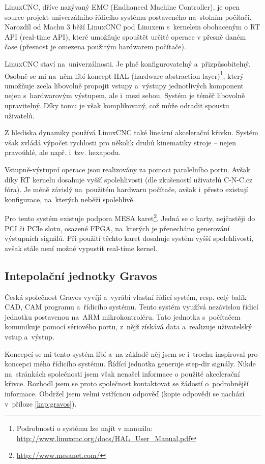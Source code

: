 		LinuxCNC, dříve nazývaný EMC (Endhanced Machine Controller), je open source projekt univerzálního řídicího systému postaveného na~stolním počítači\cite{linuxcnc}. Narozdíl od Machu 3 běží LinuxCNC pod Linuxem s~kernelem obohaceným o RT API (real-time API), které umožňuje spouštět určité operace v přesně daném čase (přesnost je omezena použitým hardwarem počítače).
		
		LinuxCNC staví na~univerzálnosti. Je plně konfigurovatelný a~přizpůsobitelný. Osobně se mi na~něm líbí koncept HAL (hardware abstraction layer)\footnote{Podrobnosti o systému lze najít v manuálu: \url{http://www.linuxcnc.org/docs/HAL\_User\_Manual.pdf}}, který umožňuje zcela libovolně propojit vstupy a~výstupy jednotlivých komponent nejen s~hardwarovým výstupem, ale i~mezi sebou. Systém je téměř libovolně upravitelný. Díky tomu je však komplikovaný, což může odradit spoustu uživatelů. 
		
		Z hlediska dynamiky používá LinuxCNC také lineární akcelerační křivku. Systém však zvládá výpočet rychlosti pro několik druhů kinematiky stroje -- nejen pravoúhlé, ale např. i~tzv. hexapodu.
		
		Vstupně-výstupní operace jsou realizovány za pomoci paralelního portu. Avšak díky RT kernelu dosahuje vyšší spolehlivosti (dle zkušeností uživatelů C-N-C.cz fóra\cite{c-n-c}). Je méně závislý na~použitém hardwaru počítače, avšak i~přesto existují konfigurace, na~kterých neběží spolehlivě.
		
		Pro tento systém existuje podpora MESA karet\footnote{\url{http://www.mesanet.com/}}. Jedná se o karty, nejčastěji do PCI či PCIe slotu, osazené FPGA, na~kterých je přenecháno generování výstupních signálů. Při použití těchto karet dosahuje systém vyšší spolehlivosti, avšak stále není možné vypustit real-time kernel.
		
		\subsection{Intepolační jednotky Gravos}
		
		Česká společnost Gravos vyvíjí a~vyrábí vlastní řídicí systém, resp. celý balík CAD, CAM programu a~řídicího systému\cite{gravos}. Tento systém využívá nezávislou řídicí jednotku postavenou na~ARM mikrokontroléru. Tato jednotka s~počítačem komunikuje pomocí sériového portu, z~nějž získává data a~realizuje uživatelský vstup a~výstup.
		
		Koncepcí se mi tento systém líbí a~na základě něj jsem se i~trochu inspiroval pro koncepci mého řídicího systému. Řídící jednotka generuje step-dir signály. Nikde na~stránkách společnosti jsem však nenašel informace o použité akcelerační křivce. Rozhodl jsem se proto společnost kontaktovat se žádostí o~podrobnější informace. Obdržel jsem velmi vstřícnou odpověď (kopie odpovědi se nachází v~příloze \ref{kap:gravos}).
		
